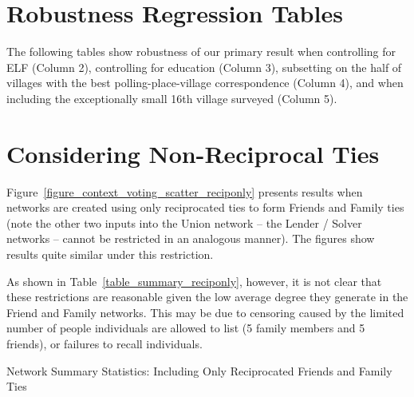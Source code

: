 \documentclass[12pt]{article}
\begin{document}
\begin{appendix}
\section{Robustness Regression Tables}\label{appendix_robustness}
The following tables show robustness of our primary result when controlling for ELF (Column 2), controlling for education (Column 3), subsetting on the half of villages with the best polling-place-village correspondence (Column 4), and when including the exceptionally small 16th village surveyed (Column 5).


\pagebreak

\section{Considering Non-Reciprocal Ties}\label{appendix_reciponly}

Figure~\ref{figure_context_voting_scatter_reciponly} presents results when networks are created using only reciprocated ties to form Friends and Family ties (note the other two inputs into the Union network -- the Lender / Solver networks -- cannot be restricted in an analogous manner). The figures show results quite similar under this restriction.

As shown in Table~\ref{table_summary_reciponly}, however, it is not clear that these restrictions are reasonable given the low average degree they generate in the Friend and Family networks. This may be due to censoring caused by the limited number of people individuals are allowed to list (5 family members and 5 friends), or failures to recall individuals.

\begin{table}
\centering
\caption{Network Summary Statistics: Including Only Reciprocated Friends and Family Ties }\label{table_summary_reciponly}

\end{table}



\end{appendix}
\end{document}
